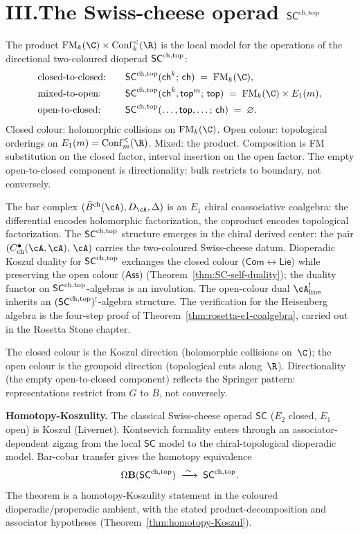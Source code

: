 \section*{III.\quad The Swiss-cheese operad $\mathsf{SC}^{\mathrm{ch,top}}$}

The product $\FM_k(\C) \times \Conf_k^<(\R)$ is the local model for
the operations of the directional two-coloured dioperad $\mathsf{SC}^{\mathrm{ch,top}}$:
\begin{alignat*}{2}
&\text{closed-to-closed:}\quad
&&\SCchtop(\mathsf{ch}^k;\,\mathsf{ch})
\;=\; \FM_k(\C), \\
&\text{mixed-to-open:}\quad
&&\SCchtop(\mathsf{ch}^k, \mathsf{top}^m;\,\mathsf{top})
\;=\; \FM_k(\C) \times E_1(m), \\
&\text{open-to-closed:}\quad
&&\SCchtop(\ldots, \mathsf{top}, \ldots;\,\mathsf{ch})
\;=\; \varnothing.
\end{alignat*}
Closed colour: holomorphic collisions on $\FM_k(\C)$. Open colour:
topological orderings on $E_1(m) = \Conf_m^<(\R)$. Mixed: the
product. Composition is FM substitution on the closed factor,
interval insertion on the open factor. The empty open-to-closed
component is directionality: bulk restricts to boundary, not
conversely.

The bar complex $(\barBch(\cA), D_\cA, \Delta)$ is an $E_1$ chiral
coassociative coalgebra: the differential encodes holomorphic
factorization, the coproduct encodes topological factorization.
The $\mathsf{SC}^{\mathrm{ch,top}}$ structure emerges in the chiral derived center:
the pair $(C^\bullet_{\mathrm{ch}}(\cA,\cA),\, \cA)$ carries the
two-coloured Swiss-cheese datum.
Dioperadic Koszul duality for $\mathsf{SC}^{\mathrm{ch,top}}$ exchanges the closed colour
($\mathsf{Com} \leftrightarrow \mathsf{Lie}$) while preserving the
open colour ($\mathsf{Ass}$)
(Theorem~\ref{thm:SC-self-duality}); the duality functor on
$\mathsf{SC}^{\mathrm{ch,top}}$-algebras is an involution.  The open-colour dual
$\cA^!_{\mathrm{line}}$ inherits an $(\mathsf{SC}^{\mathrm{ch,top}})^!$-algebra
structure. The verification
for the Heisenberg algebra is the four-step proof of
Theorem~\ref{thm:rosetta-e1-coalgebra}, carried out in the Rosetta
Stone chapter.

The closed colour is the Koszul direction (holomorphic collisions on~$\C$); the open colour is the groupoid direction (topological cuts along~$\R$). Directionality (the empty open-to-closed component) reflects the Springer pattern: representations restrict from $G$ to $B$, not conversely.

\medskip
\noindent\textbf{Homotopy-Koszulity.}\enspace
The classical Swiss-cheese operad $\mathsf{SC}$ ($E_2$ closed, $E_1$ open) is Koszul (Livernet).
Kontsevich formality enters through an associator-dependent zigzag
from the local $\mathsf{SC}$ model to the chiral-topological
dioperadic model. Bar-cobar transfer gives the homotopy equivalence
\[
\Omega\mathbf{B}(\mathsf{SC}^{\mathrm{ch,top}}) \;\xrightarrow{\;\sim\;}\; \mathsf{SC}^{\mathrm{ch,top}}.
\]
The theorem is a homotopy-Koszulity statement in the coloured
dioperadic/properadic ambient, with the stated product-decomposition
and associator hypotheses (Theorem~\ref{thm:homotopy-Koszul}).


